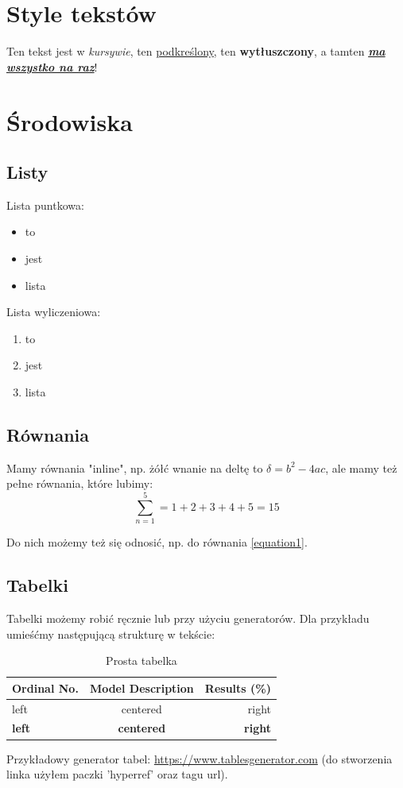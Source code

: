 \documentclass{article}
\begin{document}
\section{Style tekstów}
Ten tekst jest w \textit{kursywie}, ten \underline{podkreślony}, ten \textbf{wytłuszczony}, a tamten
\textbf{\textit{\underline{ma wszystko na raz}}}!


\section{Środowiska}
\subsection{Listy}
Lista puntkowa:
\begin{itemize}
    \item to
    \item jest
    \item lista
\end{itemize}
Lista wyliczeniowa:
\begin{enumerate}
    \item to
    \item jest
    \item lista
\end{enumerate}

\subsection{Równania}
Mamy równania "inline", np. żółć wnanie na deltę to $\delta = b^2 - 4ac$, ale mamy też
pełne równania, które lubimy:
\begin{equation}
    \label{equation1}
    \sum\limits_{n=1}^5=1+2+3+4+5=15
\end{equation}
\par
Do nich możemy też się odnosić, np. do równania \ref{equation1}.

\subsection{Tabelki}

Tabelki możemy robić ręcznie lub przy użyciu generatorów. Dla przykładu
umieśćmy następującą strukturę w tekście:
\begin{table}[h]
    \centering
    \begin{tabular}{|l|c|r|}
    \hline
    Ordinal No.   & Model Description & Results (\%)   \\ \hline
    left          & centered          & right          \\ \hline
    \textbf{left} & \textbf{centered} & \textbf{right} \\ \hline
    \end{tabular}
    \label{tabelka1}
    \caption{Prosta tabelka}
\end{table}
\par
Przykładowy generator tabel: \url{https://www.tablesgenerator.com} (do stworzenia
linka użyłem paczki ’hyperref’ oraz tagu url).\cite{book}
\end{document}
